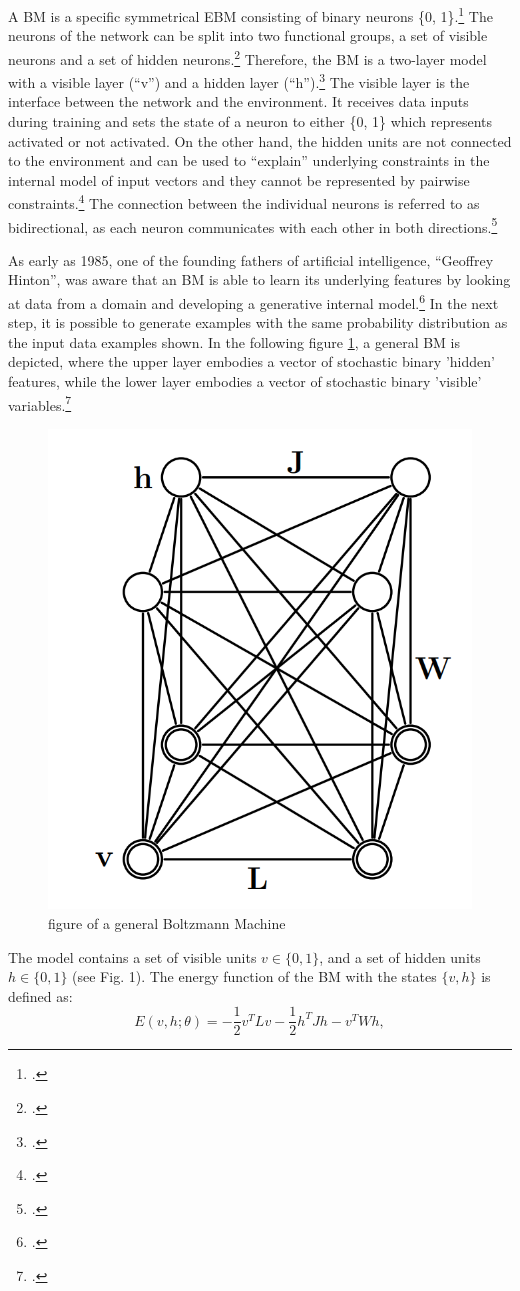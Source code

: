 A \ac{BM} is a specific symmetrical \ac{EBM} consisting of binary neurons \{0, 1\}.\footcite[Vgl.][260]{amariInformationGeometryBoltzmann1992}
The neurons of the network can be split into two functional groups, a set of visible neurons and a set of hidden neurons.\footcite[Vgl.][154]{ackleyLearningAlgorithmBoltzmann1985}
Therefore, the \ac{BM} is a two-layer model with a visible layer (``v'') and a hidden layer (``h'').\footcite[Vgl.][448]{salakhutdinovDeepBoltzmannMachines2009}
The visible layer is the interface between the network and the environment. It receives data inputs during training and sets the state of a neuron to either \{0, 1\} which represents activated or not activated.
On the other hand, the hidden units are not connected to the environment and can be used to “explain” underlying constraints in the internal model of input vectors and they cannot be represented by pairwise constraints.\footcite[Vgl.][154]{ackleyLearningAlgorithmBoltzmann1985}
The connection between the individual neurons is referred to as bidirectional, as each neuron communicates with each other in both directions.\footcite[Vgl.][149]{ackleyLearningAlgorithmBoltzmann1985}

As early as 1985, one of the founding fathers of artificial intelligence, ``Geoffrey Hinton'', was aware that an \ac{BM} is able to learn its underlying features by looking at data from a domain and developing a generative internal model.\footcite[Vgl.][148]{ackleyLearningAlgorithmBoltzmann1985}
In the next step, it is possible to generate examples with the same probability distribution as the input data examples shown.
In the following figure \ref{fig1}, a general \ac{BM} is depicted, where the upper layer embodies a vector of stochastic binary 'hidden' features, while the lower layer embodies a vector of stochastic binary 'visible' variables.\footcite[Vgl.][449]{salakhutdinovDeepBoltzmannMachines2009}

\begin{figure}[H]
    \centering
    \includegraphics[width=0.25\linewidth]{graphics/General_BM.png}
    \caption{figure of a general Boltzmann Machine}
    \label{fig1}
\end{figure}
The model contains a set of visible units \( v \in \{0, 1\} \), and a set of hidden units \( h \in \{0, 1\} \) (see Fig. 1). The energy function of the \ac{BM} with the states \( \{v, h\} \) is defined as:
\begin{equation}
E(v, h; \theta) = -\frac{1}{2} v^T L v - \frac{1}{2} h^T J h - v^T W h,
\end{equation}

